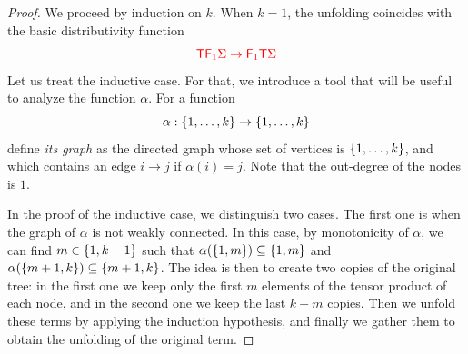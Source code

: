 \begin{proof}
We proceed by induction on $k$. When $k=1$, the unfolding coincides with the basic distributivity function 
\begin{align*}
{\color{red}{ {\color{red}{\mathsf T}}{\color{red}{\mathsf F_{1}}}\Sigma \to {{\color{red}{\mathsf F_{1}}}{\color{red}{\mathsf T}}\Sigma}}}
\end{align*}
Let us treat the inductive case. For that, we introduce a tool that will be useful to analyze the function $\alpha$. For a function $$\alpha: \{1,\ldots,k\} \to \{1,\ldots,k\}$$ define  \emph{its graph} as the directed graph whose set of vertices is $\{1,\ldots,k\}$, and which contains an edge $i\rightarrow j$ if $\alpha(i)=j$. Note that the out-degree of the nodes is $1.$

\medskip
In the proof of the inductive case, we distinguish two cases. The first one is when the graph of $\alpha$ is not weakly connected. In this case, by monotonicity of $\alpha$, we can find $m\in \{1,k-1\}$ such that $\alpha(\{1,m\})\subseteq\{1,m\}$ and $\alpha(\{m+1,k\})\subseteq\{m+1,k\}$. The idea is then to create two copies of the original tree: in the first one we keep only the first $m$ elements of the tensor product of each node, and in the second one we keep the last $k-m$ copies. Then we unfold these terms by applying the induction hypothesis, and  finally we gather them to obtain the  unfolding of the original term. 


\end{proof}
